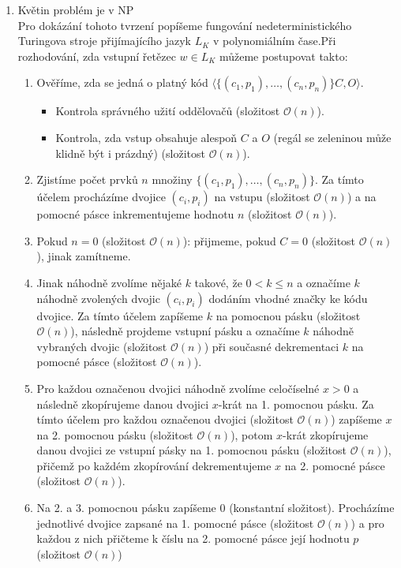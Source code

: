 \documentclass[a4paper,11pt]{article}[24.3.2010]
\begin{document}
\begin{enumerate}
\begin{enumerate}[I/]
\item Květin problém je v NP\\
Pro dokázání tohoto tvrzení popíšeme fungování nedeterministického Turingova stroje přijímajícího jazyk $L_{K}$ v polynomiálním čase.Při rozhodování, zda vstupní řetězec $w \in L_{K}$ můžeme postupovat takto:\\
\begin{enumerate}[1.]
\item Ověříme, zda se jedná o platný kód $\langle\{(c_{1},p_{1}),\dots,(c_{n},p_{n})\}C,O\rangle$.
\begin{itemize}
\item Kontrola správného užití oddělovačů (složitost $\mathcal{O}(n)$).
\item Kontrola, zda vstup obsahuje alespoň $C$ a $O$ (regál se zeleninou může klidně být i prázdný) (složitost $\mathcal{O}(n)$).
\end{itemize}
\item Zjistíme počet prvků $n$ množiny $\{(c_{1},p_{1}),\dots,(c_{n},p_{n})\}$. Za tímto účelem procházíme dvojice $(c_{i},p_{i})$ na vstupu (složitost $\mathcal{O}(n)$) a na pomocné pásce inkrementujeme hodnotu $n$ (složitost $\mathcal{O}(n)$).
\item Pokud $n = 0$ (složitost $\mathcal{O}(n)$): přijmeme, pokud $C = 0$ (složitost $\mathcal{O}(n)$), jinak zamítneme.
\item Jinak náhodně zvolíme nějaké $k$ takové, že $0< k\leq n$ a označíme $k$ náhodně zvolených dvojic $(c_{i},p_{i})$ dodáním vhodné značky ke kódu dvojice. Za tímto účelem zapíšeme $k$ na pomocnou pásku (složitost $\mathcal{O}(n)$), následně projdeme vstupní pásku a označíme $k$ náhodně vybraných dvojic (složitost $\mathcal{O}(n)$) při současné dekrementaci $k$ na pomocné pásce (složitost $\mathcal{O}(n)$). 
\item Pro každou označenou dvojici náhodně zvolíme celočíselné $x>0$ a následně zkopírujeme danou dvojici $x$-krát na 1. pomocnou pásku. Za tímto účelem pro každou označenou dvojici (složitost $\mathcal{O}(n)$) zapíšeme $x$ na 2. pomocnou pásku (složitost $\mathcal{O}(n)$), potom $x$-krát zkopírujeme danou dvojici ze vstupní pásky na 1. pomocnou pásku (složitost $\mathcal{O}(n)$), přičemž po každém zkopírování dekrementujeme $x$ na 2. pomocné pásce (složitost $\mathcal{O}(n)$).
\item Na 2. a 3. pomocnou pásku zapíšeme 0 (konstantní složitost). Procházíme jednotlivé dvojice zapsané na 1. pomocné pásce (složitost $\mathcal{O}(n)$) a pro každou z nich přičteme k číslu na 2. pomocné pásce její hodnotu $p$ (složitost $\mathcal{O}(n)$)

\end{enumerate}
\end{enumerate}
\end{enumerate}
\end{document}
